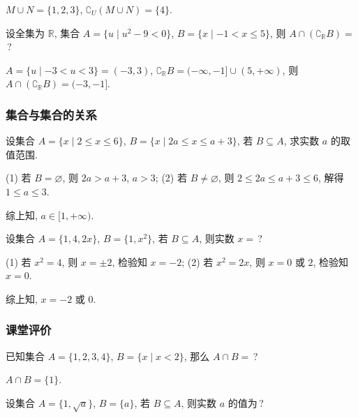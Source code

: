 \beginsolution
  $M\cup N= \{1,2,3\}$, $\complement_U (M\cup N)=\{4\}$.
\endsolution

\begin{exercise}
  设全集为 $\mathbb{R}$, 集合 $A=\{u\mid u^2 -9<0\}$, 
  $B=\{x\mid -1<x\leqslant 5\}$, 则 $A\cap (\complement_{\mathbb{R}} B)=$\,?
\end{exercise}

\beginsolution
  $A=\{u\mid -3<u<3\}=(-3,3)$, $\complement_{\mathbb{R}} B=(-\infty,-1]\cup (5,+\infty)$, 则 $A\cap (\complement_{\mathbb{R}} B)= (-3,-1]$.
\endsolution

\subsubsection{集合与集合的关系}
\begin{example}
  设集合 $A=\{x\mid 2\leqslant x\leqslant 6\}$, 
  $B=\{x\mid 2a\leqslant x\leqslant a+3\}$, 若 $B\subseteq A$, 
  求实数 $a$ 的取值范围.
\end{example}

\beginsolution
  (1) 若 $B=\varnothing$, 则 $2a>a+3$, $a>3$;
  (2) 若 $B\neq\varnothing$, 则 $2\leqslant 2a\leqslant a+3\leqslant 6$, 解得 $1\leqslant a\leqslant 3$.
  
  综上知, $a\in [1,+\infty)$.
\endsolution

\lianxi
\begin{exercise}[s]
  设集合 $A=\{1,4,2x\}$, $B=\{1,x^2\}$, 若 $B\subseteq A$, 则实数 $x=$\,?
\end{exercise}

\beginsolution
  (1) 若 $x^2=4$, 则 $x=\pm2$, 检验知 $x=-2$;
  (2) 若 $x^2=2x$, 则 $x=0$ 或 $2$, 检验知 $x=0$.
  
  综上知, $x=-2$ 或 $0$.
\endsolution

\subsubsection{课堂评价}
\begin{exercise}
  已知集合 $A=\{1,2,3,4\}$, $B=\{x\mid x<2\}$, 那么 $A\cap B=$\,?
\end{exercise}

\beginsolution
  $A\cap B=\{1\}$.
\endsolution

\begin{exercise}
  设集合 $A=\{1, \sqrt{a}\}$, $B=\{a\}$, 若 $B\subseteq A$, 
  则实数 $a$ 的值为\,?
\end{exercise}

